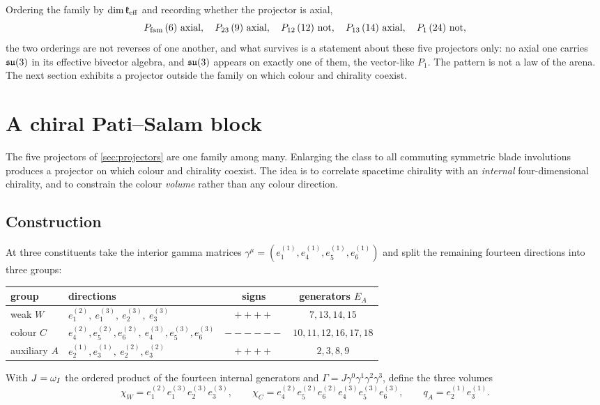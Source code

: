 Ordering the family by $\dim\mathfrak k_{\rm eff}$ and recording whether the projector is axial,
\[
\Pfam\,(6)\ \text{axial},\quad P_{23}\,(9)\ \text{axial},\quad P_{12}\,(12)\ \text{not},\quad P_{13}\,(14)\ \text{axial},\quad P_1\,(24)\ \text{not},
\]
the two orderings are not reverses of one another, and what survives is a statement about these five projectors only: no axial one
carries $\mathfrak{su}(3)$ in its effective bivector algebra, and $\mathfrak{su}(3)$ appears on exactly one of them, the vector-like $P_1$. The pattern is
not a law of the arena. The next section exhibits a projector outside the family on which colour and chirality coexist.



\section{A chiral Pati--Salam block}
\label{sec:pstar}

The five projectors of \cref{sec:projectors} are one family among many. Enlarging the class to all commuting symmetric blade
involutions produces a projector on which colour and chirality coexist. The idea is to correlate spacetime chirality with an
\emph{internal} four-dimensional chirality, and to constrain the colour \emph{volume} rather than any colour direction.

\subsection{Construction}

At three constituents take the interior gamma matrices $\gamma^\mu=(e^{(1)}_1,e^{(1)}_4,e^{(1)}_5,e^{(1)}_6)$ and split the remaining
fourteen directions into three groups:
\begin{center}
\begin{tabular}{@{}llcc@{}}
\toprule
group & directions & signs & generators $E_A$\\
\midrule
weak $W$ & $e^{(2)}_1,\ e^{(3)}_1,\ e^{(3)}_2,\ e^{(3)}_3$ & $++++$ & $7,13,14,15$\\
colour $C$ & $e^{(2)}_4,e^{(2)}_5,e^{(2)}_6,\ e^{(3)}_4,e^{(3)}_5,e^{(3)}_6$ & $------$ & $10,11,12,16,17,18$\\
auxiliary $A$ & $e^{(1)}_2,e^{(1)}_3,\ e^{(2)}_2,e^{(2)}_3$ & $++++$ & $2,3,8,9$\\
\bottomrule
\end{tabular}
\end{center}
With $J=\omega_I$ the ordered product of the fourteen internal generators and $\Gamma=J\gamma^0\gamma^1\gamma^2\gamma^3$, define the three
volumes
\[
\chi_W=e^{(2)}_1e^{(3)}_1e^{(3)}_2e^{(3)}_3,\qquad
\chi_C=e^{(2)}_4e^{(2)}_5e^{(2)}_6e^{(3)}_4e^{(3)}_5e^{(3)}_6,\qquad
q_A=e^{(1)}_2e^{(1)}_3 .
\]

